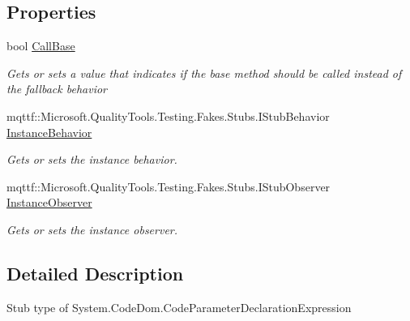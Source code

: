\subsection*{Properties}
\begin{DoxyCompactItemize}
\item 
bool \hyperlink{class_system_1_1_code_dom_1_1_fakes_1_1_stub_code_parameter_declaration_expression_a8f04d673de627a35c4c13c5c19974981}{Call\-Base}
\begin{DoxyCompactList}\small\item\em Gets or sets a value that indicates if the base method should be called instead of the fallback behavior\end{DoxyCompactList}\item 
mqttf\-::\-Microsoft.\-Quality\-Tools.\-Testing.\-Fakes.\-Stubs.\-I\-Stub\-Behavior \hyperlink{class_system_1_1_code_dom_1_1_fakes_1_1_stub_code_parameter_declaration_expression_a5112db7d7cf95dc5296258a12bbb78d5}{Instance\-Behavior}
\begin{DoxyCompactList}\small\item\em Gets or sets the instance behavior.\end{DoxyCompactList}\item 
mqttf\-::\-Microsoft.\-Quality\-Tools.\-Testing.\-Fakes.\-Stubs.\-I\-Stub\-Observer \hyperlink{class_system_1_1_code_dom_1_1_fakes_1_1_stub_code_parameter_declaration_expression_aeb413c1cb159ad9571d65e524b59d251}{Instance\-Observer}
\begin{DoxyCompactList}\small\item\em Gets or sets the instance observer.\end{DoxyCompactList}\end{DoxyCompactItemize}


\subsection{Detailed Description}
Stub type of System.\-Code\-Dom.\-Code\-Parameter\-Declaration\-Expression



